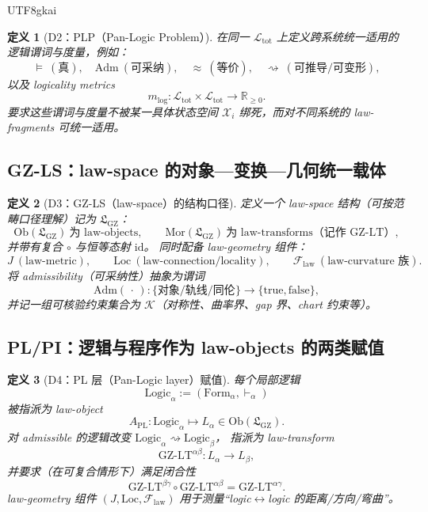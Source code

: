 \documentclass[12pt]{article}
\newtheorem{definition}{定义}[section]
\begin{document}
\begin{CJK*}{UTF8}{gkai}
\begin{definition}[D2：PLP（Pan-Logic Problem）]
\label{def:tex19-appB-D2-plp}
在同一 $\mathcal{L}_{\mathrm{tot}}$ 上定义跨系统统一适用的逻辑谓词与度量，例如：
\[
\vDash\ (\text{真}),\quad \mathrm{Adm}\ (\text{可采纳}),\quad \approx\ (\text{等价}),\quad \rightsquigarrow\ (\text{可推导/可变形}),
\]
以及 logicality metrics
\[
m_{\mathrm{log}}:\mathcal{L}_{\mathrm{tot}}\times \mathcal{L}_{\mathrm{tot}}\to \mathbb{R}_{\ge 0}.
\]
要求这些谓词与度量不被某一具体状态空间 $\mathcal{X}_i$ 绑死，而对不同系统的 law-fragments 可统一适用。
\end{definition}

\subsection{GZ-LS：law-space 的对象—变换—几何统一载体}
\label{subsec:tex19-appB-gzls}

\begin{definition}[D3：GZ-LS（law-space）的结构口径]
\label{def:tex19-appB-D3-gzls}
定义一个 law-space 结构（可按范畴口径理解）记为 $\mathfrak{L}_{\mathrm{GZ}}$：
\[
\mathrm{Ob}(\mathfrak{L}_{\mathrm{GZ}})\ \text{为 law-objects},\qquad
\mathrm{Mor}(\mathfrak{L}_{\mathrm{GZ}})\ \text{为 law-transforms（记作 GZ-LT）},
\]
并带有复合 $\circ$ 与恒等态射 $\mathrm{id}$。
同时配备 law-geometry 组件：
\[
J\ (\text{law-metric}),\qquad \mathrm{Loc}\ (\text{law-connection/locality}),\qquad \mathcal{F}_{\mathrm{law}}\
  (\text{law-curvature 族}).
\]
将 admissibility（可采纳性）抽象为谓词
\[
\mathrm{Adm}(\,\cdot\,):\{\text{对象/轨线/同伦}\}\to \{\mathrm{true},\mathrm{false}\},
\]
并记一组可核验约束集合为 $\mathcal{K}$（对称性、曲率界、gap 界、chart 约束等）。
\end{definition}

\subsection{PL/PI：逻辑与程序作为 law-objects 的两类赋值}
\label{subsec:tex19-appB-pl-pi-assignments}

\begin{definition}[D4：PL 层（Pan-Logic layer）赋值]
\label{def:tex19-appB-D4-pl}
每个局部逻辑
\[
\mathrm{Logic}_\alpha:=(\mathrm{Form}_\alpha,\vdash_\alpha)
\]
被指派为 law-object
\[
A_{\mathrm{PL}}:\mathrm{Logic}_\alpha\mapsto L_\alpha\in \mathrm{Ob}(\mathfrak{L}_{\mathrm{GZ}}).
\]
对 admissible 的逻辑改变 $\mathrm{Logic}_\alpha \rightsquigarrow \mathrm{Logic}_\beta$，
指派为 law-transform
\[
\mathrm{GZ\text{-}LT}^{\alpha\beta}:L_\alpha\to L_\beta,
\]
并要求（在可复合情形下）满足闭合性
\[
\mathrm{GZ\text{-}LT}^{\beta\gamma}\circ \mathrm{GZ\text{-}LT}^{\alpha\beta}=\mathrm{GZ\text{-}LT}^{\alpha\gamma}.
\]
law-geometry 组件 $(J,\mathrm{Loc},\mathcal{F}_{\mathrm{law}})$ 用于测量“logic$\leftrightarrow$logic 的距离/方向/弯曲”。
\end{definition}


\end{CJK*}
\end{document}
